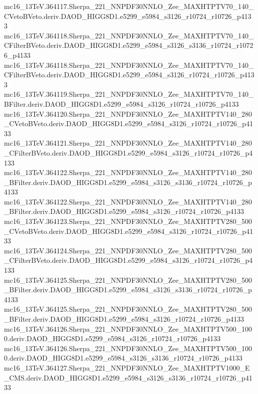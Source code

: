 \begin{scriptsize}
mc16\_13TeV.364117.Sherpa\_221\_NNPDF30NNLO\_Zee\_MAXHTPTV70\_140\_CVetoBVeto.deriv.DAOD\_HIGG8D1.e5299\_e5984\_s3126\_r10724\_r10726\_p4133 \\
mc16\_13TeV.364118.Sherpa\_221\_NNPDF30NNLO\_Zee\_MAXHTPTV70\_140\_CFilterBVeto.deriv.DAOD\_HIGG8D1.e5299\_e5984\_s3126\_s3136\_r10724\_r10726\_p4133 \\
mc16\_13TeV.364118.Sherpa\_221\_NNPDF30NNLO\_Zee\_MAXHTPTV70\_140\_CFilterBVeto.deriv.DAOD\_HIGG8D1.e5299\_e5984\_s3126\_r10724\_r10726\_p4133 \\
mc16\_13TeV.364119.Sherpa\_221\_NNPDF30NNLO\_Zee\_MAXHTPTV70\_140\_BFilter.deriv.DAOD\_HIGG8D1.e5299\_e5984\_s3126\_r10724\_r10726\_p4133 \\
mc16\_13TeV.364120.Sherpa\_221\_NNPDF30NNLO\_Zee\_MAXHTPTV140\_280\_CVetoBVeto.deriv.DAOD\_HIGG8D1.e5299\_e5984\_s3126\_r10724\_r10726\_p4133 \\
mc16\_13TeV.364121.Sherpa\_221\_NNPDF30NNLO\_Zee\_MAXHTPTV140\_280\_CFilterBVeto.deriv.DAOD\_HIGG8D1.e5299\_e5984\_s3126\_r10724\_r10726\_p4133 \\
mc16\_13TeV.364122.Sherpa\_221\_NNPDF30NNLO\_Zee\_MAXHTPTV140\_280\_BFilter.deriv.DAOD\_HIGG8D1.e5299\_e5984\_s3126\_s3136\_r10724\_r10726\_p4133 \\
mc16\_13TeV.364122.Sherpa\_221\_NNPDF30NNLO\_Zee\_MAXHTPTV140\_280\_BFilter.deriv.DAOD\_HIGG8D1.e5299\_e5984\_s3126\_r10724\_r10726\_p4133 \\
mc16\_13TeV.364123.Sherpa\_221\_NNPDF30NNLO\_Zee\_MAXHTPTV280\_500\_CVetoBVeto.deriv.DAOD\_HIGG8D1.e5299\_e5984\_s3126\_r10724\_r10726\_p4133 \\
mc16\_13TeV.364124.Sherpa\_221\_NNPDF30NNLO\_Zee\_MAXHTPTV280\_500\_CFilterBVeto.deriv.DAOD\_HIGG8D1.e5299\_e5984\_s3126\_r10724\_r10726\_p4133 \\
mc16\_13TeV.364125.Sherpa\_221\_NNPDF30NNLO\_Zee\_MAXHTPTV280\_500\_BFilter.deriv.DAOD\_HIGG8D1.e5299\_e5984\_s3126\_s3136\_r10724\_r10726\_p4133 \\
mc16\_13TeV.364125.Sherpa\_221\_NNPDF30NNLO\_Zee\_MAXHTPTV280\_500\_BFilter.deriv.DAOD\_HIGG8D1.e5299\_e5984\_s3126\_r10724\_r10726\_p4133 \\
mc16\_13TeV.364126.Sherpa\_221\_NNPDF30NNLO\_Zee\_MAXHTPTV500\_1000.deriv.DAOD\_HIGG8D1.e5299\_e5984\_s3126\_r10724\_r10726\_p4133 \\
mc16\_13TeV.364126.Sherpa\_221\_NNPDF30NNLO\_Zee\_MAXHTPTV500\_1000.deriv.DAOD\_HIGG8D1.e5299\_e5984\_s3126\_s3136\_r10724\_r10726\_p4133 \\
mc16\_13TeV.364127.Sherpa\_221\_NNPDF30NNLO\_Zee\_MAXHTPTV1000\_E\_CMS.deriv.DAOD\_HIGG8D1.e5299\_e5984\_s3126\_s3136\_r10724\_r10726\_p4133 \\

\end{scriptsize}
